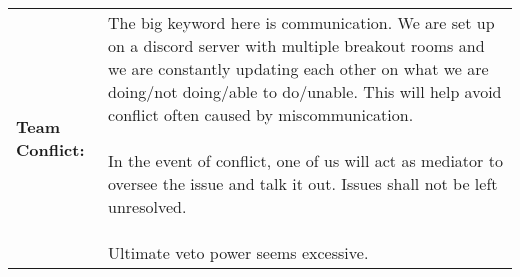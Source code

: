 \documentclass[a4paper,12pt]{article}
\begin{document}
\centering
\vspace{0.2cm}
\begin{tabular}{|p{}|p{}|}
    \hline
   \textbf{Team Conflict:} & \parbox{0.65\textwidth}{\vspace{0.3cm}The big keyword here is communication. We are set up on a discord server with multiple breakout rooms and we are constantly updating each other on what we are doing/not doing/able to do/unable. This will help avoid conflict often caused by miscommunication. \\ \\ In the event of conflict, one of us will act as mediator to oversee the issue and talk it out. Issues shall not be left unresolved. \\ \\ Ultimate veto power seems excessive. \vspace{0.3cm}} \\
   \hline
\end{tabular}
\end{document}
